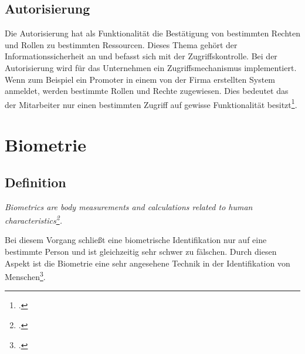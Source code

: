 \subsection{Autorisierung}
Die Autorisierung hat als Funktionalität die Bestätigung von bestimmten Rechten und Rollen zu bestimmten Ressourcen. Dieses Thema gehört der Informationssicherheit an und befasst sich mit der Zugriffskontrolle. Bei der Autorisierung wird für das Unternehmen ein Zugriffsmechanismus implementiert. Wenn zum Beispiel ein Promoter in einem von der Firma erstellten System anmeldet, werden bestimmte Rollen und Rechte zugewiesen. Dies bedeutet das der Mitarbeiter nur einen bestimmten Zugriff auf gewisse Funktionalität besitzt\footcite{anmeldevorgangs}.


\newpage
\section{Biometrie}
\subsection{Definition}
\begin{center}
	\textit{Biometrics are body measurements and calculations related to human characteristics\footcite{biometrie}.}
\end{center}

Bei diesem Vorgang schließt eine biometrische Identifikation nur auf eine bestimmte Person und ist gleichzeitig sehr schwer zu fälschen.
Durch diesen Aspekt ist die Biometrie eine sehr angesehene Technik in der Identifikation von Menschen\footcite{biometrie}.

